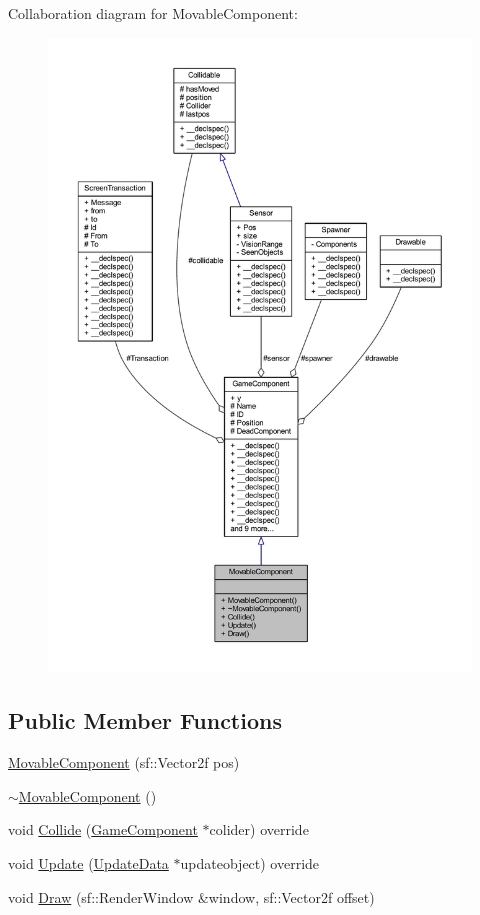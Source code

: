 Collaboration diagram for Movable\-Component\-:
\nopagebreak
\begin{figure}[H]
\begin{center}
\leavevmode
\includegraphics[width=350pt]{class_movable_component__coll__graph}
\end{center}
\end{figure}
\subsection*{Public Member Functions}
\begin{DoxyCompactItemize}
\item 
\hyperlink{class_movable_component_aea0453392e1d269a4b4c207728a3ddaf}{Movable\-Component} (sf\-::\-Vector2f pos)
\item 
\hyperlink{class_movable_component_aedc5ac024682262c99436b2b5fadddc1}{$\sim$\-Movable\-Component} ()
\item 
void \hyperlink{class_movable_component_a5ab32fd53c29a29ddcd68f1bb38a5f2b}{Collide} (\hyperlink{class_game_component}{Game\-Component} $\ast$colider) override
\item 
void \hyperlink{class_movable_component_a6310c2306c503472873721a9756003a8}{Update} (\hyperlink{class_update_data}{Update\-Data} $\ast$updateobject) override
\item 
void \hyperlink{class_movable_component_a75c4dad8db642791c52d7fc5e9a92429}{Draw} (sf\-::\-Render\-Window \&window, sf\-::\-Vector2f offset)
\end{DoxyCompactItemize}
